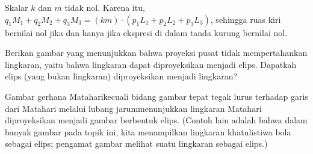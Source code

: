 \begin{exercises}
\begin{answer}
      Skalar $k$ dan $m$ tidak nol. Karena itu,
      $q_1M_1+q_2M_2+q_3M_3
        =(km)\cdot(p_1L_1+p_2L_2+p_3L_3)$,
      sehingga ruas kiri bernilai nol jika dan hanya jika ekspresi di dalam
      tanda kurung bernilai nol.
    \end{answer}
  \item 
    Berikan gambar yang menunjukkan bahwa proyeksi pusat tidak mempertahankan
    lingkaran, yaitu bahwa lingkaran dapat diproyeksikan menjadi elips.
    Dapatkah elips (yang bukan lingkaran) diproyeksikan menjadi lingkaran?
    \begin{answer}
      Gambar gerhana Matahari\Dash kecuali bidang gambar tepat tegak lurus
      terhadap garis dari Matahari melalui lubang jarum\Dash menunjukkan
      lingkaran Matahari diproyeksikan menjadi gambar berbentuk elips.
      (Contoh lain adalah bahwa dalam banyak gambar pada topik ini, kita
      menampilkan lingkaran khatulistiwa bola sebagai elips; pengamat gambar
      melihat suatu lingkaran sebagai elips.)
      

\end{answer}
\end{exercises}
